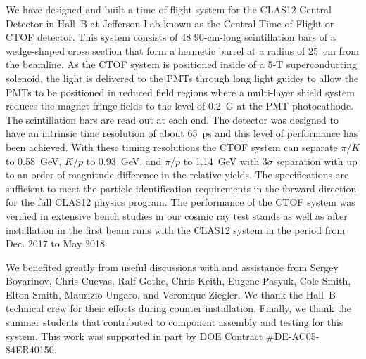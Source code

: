 \documentclass{elsart}
\begin{document}
We have designed and built a time-of-flight system for the CLAS12 Central Detector in Hall~B 
at Jefferson Lab known as the Central Time-of-Flight or CTOF detector. This system consists 
of 48 90-cm-long scintillation bars of a wedge-shaped cross section that form a hermetic barrel
at a radius of 25~cm from the beamline. As the CTOF system is positioned inside of a 5-T
superconducting solenoid, the light is delivered to the PMTs through long light guides to allow the
PMTs to be positioned in reduced field regions where a multi-layer shield system reduces the
magnet fringe fields to the level of 0.2~G at the PMT photocathode. The scintillation bars are read
out at each end. The detector was designed to have an intrinsic time resolution of about 65~ps and
this level of performance has been achieved. With these timing resolutions the CTOF system can
separate $\pi/K$ to 0.58~GeV, $K/p$ to 0.93~GeV, and $\pi/p$ to 1.14~GeV with 3$\sigma$
separation with up to an order of magnitude difference in the relative yields.  The specifications are
sufficient to meet the particle identification requirements in the forward direction for the full CLAS12
physics program. The performance of the CTOF system was verified in extensive bench studies in our
cosmic ray test stands as well as after installation in the first beam runs with the CLAS12 system in
the period from Dec. 2017 to May 2018. 

\ack

We benefited greatly from useful discussions with and assistance from Sergey Boyarinov, Chris
Cuevas, Ralf Gothe, Chris Keith, Eugene Pasyuk, Cole Smith, Elton Smith, Maurizio Ungaro, and
Veronique Ziegler. We thank the Hall~B technical crew for their efforts during counter installation.
Finally, we thank the summer students that contributed to component assembly and testing for this
system. This work was supported in part by DOE Contract \#DE-AC05-84ER40150.
\end{document}

